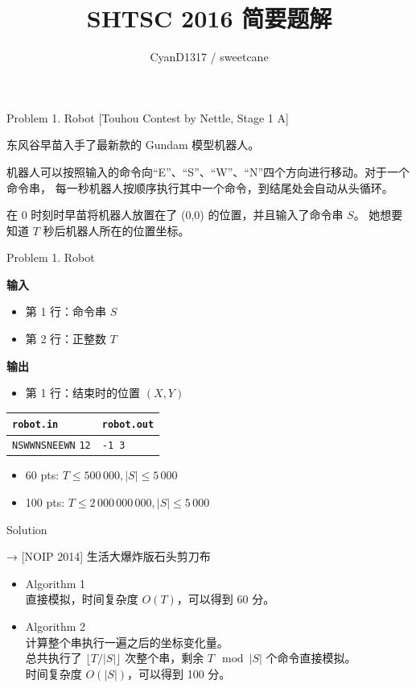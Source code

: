 \documentclass[UTF8]{beamer}
\begin{document}
\title{SHTSC 2016 简要题解}
\author{CyanD1317 / sweetcane}
\frame{\titlepage}


\begin{frame}{Problem 1. Robot}
[Touhou Contest by Nettle, Stage 1 A]

东风谷早苗入手了最新款的 Gundam 模型机器人。

机器人可以按照输入的命令向“E”、“S”、“W”、“N”四个方向进行移动。对于一个命令串，
每一秒机器人按顺序执行其中一个命令，到结尾处会自动从头循环。

在 0 时刻时早苗将机器人放置在了 (0,0) 的位置，并且输入了命令串 $S$。
她想要知道 $T$ 秒后机器人所在的位置坐标。

\end{frame}

\begin{frame}{Problem 1. Robot}

\textbf{输入}
\begin{itemize}
    \item 第 1 行：命令串 $S$
    \item 第 2 行：正整数 $T$
\end{itemize}
\textbf{输出}
\begin{itemize}
    \item 第 1 行：结束时的位置 $(X, Y)$
\end{itemize}

\begin{tabularx}{\textwidth}{|X|X|}
\hline
\texttt{\textbf{robot.in}} & \texttt{\textbf{robot.out}} \\ \hline
\texttt{NSWWNSNEEWN}\newline
\texttt{12}
&
\texttt{-1 3}
\\ \hline
\end{tabularx}
\newline
\begin{itemize}
    \item 60 pts: $T \leq 500\,000, |S| \leq 5\,000$
    \item 100 pts: $T \leq 2\,000\,000\,000, |S| \leq 5\,000$
\end{itemize}

\end{frame}

\begin{frame}{Solution}

→ [NOIP 2014] 生活大爆炸版石头剪刀布

\begin{itemize}
    \item Algorithm 1 \\
        直接模拟，时间复杂度 $O(T)$，可以得到 60 分。
    \pause
    \item Algorithm 2 \\
        计算整个串执行一遍之后的坐标变化量。 \\
        总共执行了 $\lfloor T / |S| \rfloor$ 次整个串，剩余 $T \mod |S|$ 个命令直接模拟。 \\
        时间复杂度 $O(|S|)$，可以得到 100 分。
\end{itemize}

\end{frame}
\end{document}
